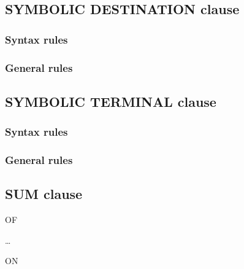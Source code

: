 \subsection{SYMBOLIC DESTINATION clause}

\begin{syntax}[\deletedcolour]
\end{syntax}

\subsubsection{Syntax rules}

\subsubsection{General rules}

\subsection{SYMBOLIC TERMINAL clause}

\begin{syntax}[\deletedcolour]
\end{syntax}

\subsubsection{Syntax rules}

\subsubsection{General rules}

\subsection{SUM clause}

\begin{syntax}
   OF
  \begin{1=}
  \end{1=}\ldots
  \begin{0-1}
     ON
    \begin{1=}
      \identifier \\
    \end{1=}
  \end{0-1}
\end{syntax}

